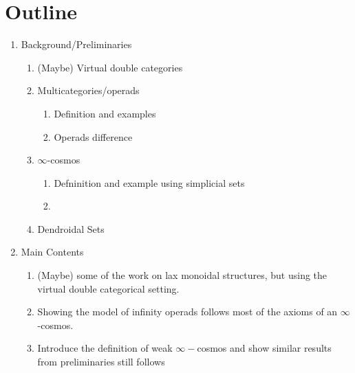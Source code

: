 \chapter{Outline}
\label{chap:out}
\begin{enumerate}
    \item Background/Preliminaries
    \begin{enumerate}
        \item (Maybe) Virtual double categories 
        \item Multicategories/operads
        \begin{enumerate}
            \item Definition and examples
            \item Operads difference
        \end{enumerate}
        \item $\infty$-cosmos
        \begin{enumerate}
            \item Defninition and example using simplicial sets
            \item 
        \end{enumerate}
        \item Dendroidal Sets
    \end{enumerate}
    \item Main Contents
    \begin{enumerate}
        \item (Maybe) some of the work on lax monoidal structures, but using the virtual double categorical setting.
        \item Showing the model of infinity operads follows most of the axioms of an $\infty$-cosmos.
        \item Introduce the definition of weak $\infty-$cosmos and show similar results from preliminaries still follows
    \end{enumerate}
\end{enumerate}
